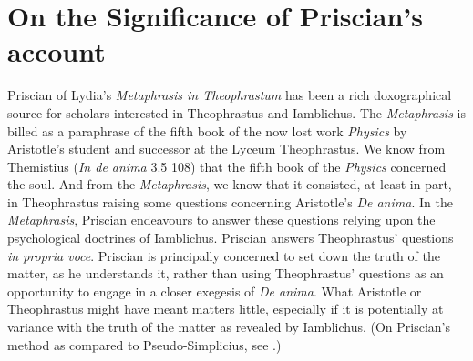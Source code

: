 \documentclass[12pt]{article}
\title{\mytitle}
\author{\myauthor}
\date{} %
\begin{document}
\maketitle
\begin{abstract} %
\noindent An \emph{aporia} posed by Theophrastus prompts Priscian to describe the process by which perception formally assimilates to its object as a progressive perfection. I present an interpretation of Priscian's account of perception's progressive perfection. And I consider a dilemma for the general class of accounts to which Priscian's belongs based on related problems raised by Plotinus and Aquinas. Doing so reveals the explanatory structure of Priscian's account and the limitations of the general class of accounts to which Priscian's belongs.
\end{abstract}

\setlength{\parindent}{1em}


\section{On the Significance of Priscian's account} %
\label{sec:on_the_significance_of_priscian_s_account}

Priscian of Lydia's \emph{Metaphrasis in Theophrastum} has been a rich doxographical source for scholars interested in Theophrastus and Iamblichus. The \emph{Metaphrasis} is billed as a paraphrase of the fifth book of the now lost work \emph{Physics} by Aristotle's student and successor at the Lyceum Theophrastus. We know from Themistius (\emph{In de anima} 3.5 108) that the fifth book of the \emph{Physics} concerned the soul. And from the \emph{Metaphrasis}, we know that it consisted, at least in part, in Theophrastus raising some questions concerning Aristotle's \emph{De anima}. In the \emph{Metaphrasis}, Priscian endeavours to answer these questions relying upon the psychological doctrines of Iamblichus. Priscian answers Theophrastus' questions \emph{in propria voce}. Priscian is principally concerned to set down the truth of the matter, as he understands it, rather than using Theophrastus' questions as an opportunity to engage in a closer exegesis of \emph{De anima}. What Aristotle or Theophrastus might have meant matters little, especially if it is potentially at variance with the truth of the matter as revealed by Iamblichus. (On Priscian's method as compared to Pseudo-Simplicius, see \citealt[7--10]{Steel:1978th}.)
\end{document}

